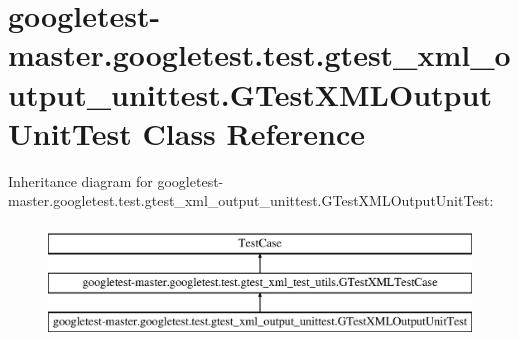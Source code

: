 \hypertarget{classgoogletest-master_1_1googletest_1_1test_1_1gtest__xml__output__unittest_1_1_g_test_x_m_l_output_unit_test}{}\section{googletest-\/master.googletest.\+test.\+gtest\+\_\+xml\+\_\+output\+\_\+unittest.\+G\+Test\+X\+M\+L\+Output\+Unit\+Test Class Reference}
\label{classgoogletest-master_1_1googletest_1_1test_1_1gtest__xml__output__unittest_1_1_g_test_x_m_l_output_unit_test}
Inheritance diagram for googletest-\/master.googletest.\+test.\+gtest\+\_\+xml\+\_\+output\+\_\+unittest.\+G\+Test\+X\+M\+L\+Output\+Unit\+Test\+:\begin{figure}[H]
\begin{center}
\leavevmode
\includegraphics[height=3.000000cm]{de/d40/classgoogletest-master_1_1googletest_1_1test_1_1gtest__xml__output__unittest_1_1_g_test_x_m_l_output_unit_test}
\end{center}
\end{figure}
